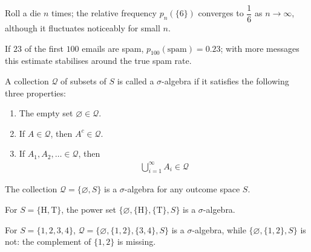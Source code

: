 \documentclass[a4paper, 12pt]{book}
\begin{document}
\begin{example}
    Roll a die $n$ times; the relative frequency $p_n(\{6\})$ converges to $\dfrac{1}{6}$ as $n\to\infty$, although it fluctuates noticeably for small $n$.
\end{example}

\begin{example}
    If $23$ of the first $100$ emails are spam, $p_{100}(\text{spam})=0.23$; with more messages this estimate stabilises around the true spam rate.
\end{example}

\begin{definition}
     A collection $\mathcal{Q}$ of subsets of $S$ is called a $\sigma$-algebra if it satisfies the following three properties:
\begin{enumerate}
    \item The empty set $\varnothing \in \mathcal{Q}$.
    \item If $A \in \mathcal{Q}$, then $A^c \in \mathcal{Q}$.
    \item If $A_1, A_2, \ldots \in \mathcal{Q}$, then 
    \begin{align}
        \bigcup_{i=1}^\infty A_i \in \mathcal{Q}    
    \end{align}
\end{enumerate}
\end{definition}

\begin{example}
    The collection $\mathcal{Q}=\{\varnothing,S\}$ is a $\sigma$-algebra for any outcome space $S$.
\end{example}

\begin{example}
    For $S=\{\mathrm{H},\mathrm{T}\}$, the power set $\{\varnothing,\{\mathrm{H}\},\{\mathrm{T}\},S\}$ is a $\sigma$-algebra.
\end{example}

\begin{example}
    For $S=\{1,2,3,4\}$, $\mathcal{Q}=\{\varnothing,\{1,2\},\{3,4\},S\}$ is a $\sigma$-algebra, while $\{\varnothing,\{1,2\},S\}$ is not: the complement of $\{1,2\}$ is missing.
\end{example}
\end{document}
